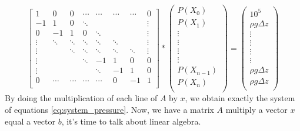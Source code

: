 \begin{equation}
\label{eq:ax_b}
\begin{bmatrix}
   1   &    0   &    0   & \cdots & \cdots & \cdots & \cdots &   0    \\
  -1   &    1   &    0   & \ddots &        &        &        & \vdots \\
   0   &   -1   &    1   &    0   & \ddots &        &        & \vdots \\
\vdots & \ddots & \ddots & \ddots & \ddots & \ddots &        & \vdots \\
\vdots &        & \ddots & \ddots & \ddots & \ddots & \ddots & \vdots \\
\vdots &        &        & \ddots &   -1   &    1   &    0   &   0    \\
\vdots &        &        &        & \ddots &   -1   &    1   &   0    \\
   0   & \cdots & \cdots & \cdots & \cdots &    0   &   -1   &   1    \\
\end{bmatrix}
*
\begin{pmatrix}
  P(X_0)  \\
  P(X_1)  \\
\vdots \\
\vdots \\
\vdots \\
\vdots \\
P(X_{n-1}) \\
  P(X_n)  \\
\end{pmatrix}
=
\begin{pmatrix}
 10^5  \\
\rho{}g\Delta{z}     \\
\vdots \\
\vdots \\
\vdots \\
\vdots \\
\rho{}g\Delta{z} \\
\rho{}g\Delta{z}    \\
\end{pmatrix}
\end{equation}
By doing the multiplication of each line of $A$ by $x$, we obtain exactly the system of equations \ref{eq:system_pressure}.
%
Now, we have a matrix $A$ multiply a vector $x$ equal a vector $b$, it's time to talk about linear algebra.
